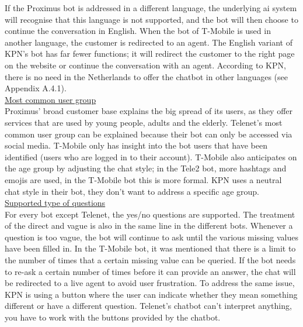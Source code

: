 If the Proximus bot is addressed in a different language, the underlying \acrshort{ai} system will recognise that this language is not supported, and the bot will then choose to continue the conversation in English. When the bot of T-Mobile is used in another language, the customer is redirected to an agent. The English variant of KPN's bot has far fewer functions; it will redirect the customer to the right page on the website or continue the conversation with an agent. According to KPN, there is no need in the Netherlands to offer the chatbot in other languages (see Appendix A.4.1). \\
\break
\ul{Most common user group}\\
Proximus' broad customer base explains the big spread of its users, as they offer services that are used by young people, adults and the elderly. Telenet's most common user group can be explained because their bot can only be accessed via social media. T-Mobile only has insight into the bot users that have been identified (users who are logged in to their account). T-Mobile also anticipates on the age group by adjusting the chat style; in the Tele2 bot, more hashtags and emojis are used, in the T-Mobile bot this is more formal. KPN uses a neutral chat style in their bot, they don't want to address a specific age group.\\
\break
\ul{Supported type of questions}\\
For every bot except Telenet, the yes/no questions are supported. The treatment of the direct and vague is also in the same line in the different bots. Whenever a question is too vague, the bot will continue to ask until the various missing values have been filled in. In the T-Mobile bot, it was mentioned that there is a limit to the number of times that a certain missing value can be queried. If the bot needs to re-ask a certain number of times before it can provide an answer, the chat will be redirected to a live agent to avoid user frustration. To address the same issue, KPN is using a button where the user can indicate whether they mean something different or have a different question. Telenet's chatbot can't interpret anything, you have to work with the buttons provided by the chatbot.\\
